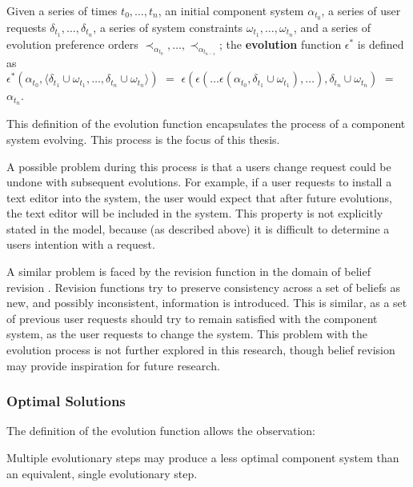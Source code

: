 \begin{defs}
Given a series of times $t_0,\ldots,t_n$, an initial component system $\alpha_{t_0}$, 
a series of user requests $\delta_{t_1},\ldots,\delta_{t_n}$, a series of system constraints $\omega_{t_1},\ldots,\omega_{t_n}$,
and a series of evolution preference orders $\prec_{\alpha_{t_0}},\ldots, \prec_{\alpha_{t_{n-1}}}$;
the \textbf{evolution} function $\epsilon^*$ is defined as\\
$\epsilon^*(\alpha_{t_0},\langle \delta_{t_1} \cup \omega_{t_1},\ldots,\delta_{t_n} \cup \omega_{t_n} \rangle)$ $=$ $\epsilon(\epsilon(\ldots \epsilon(\alpha_{t_0},\delta_{t_1} \cup \omega_{t_1}),\ldots),\delta_{t_n} \cup \omega_{t_n})$
$=$ $\alpha_{t_n}$.
\end{defs}

This definition of the evolution function encapsulates the process of a component system evolving.
This process is the focus of this thesis.

A possible problem during this process is that a users change request could be undone with subsequent evolutions.
For example, if a user requests to install a text editor into the system, 
the user would expect that after future evolutions, the text editor will be included in the system.
This property is not explicitly stated in the model, because (as described above) it is difficult to determine a users intention with a request.

A similar problem is faced by the revision function in the domain of belief revision \citep{alchourron1985logic}.
Revision functions try to preserve consistency across a set of beliefs as new, and possibly inconsistent, information is introduced.
This is similar, as a set of previous user requests should try to remain satisfied with the component system, as the user requests to change the system.    
This problem with the evolution process is not further explored in this research, though belief revision may provide inspiration for future research.

\subsubsection{Optimal Solutions}
The definition of the evolution function allows the observation:
\begin{obs}
Multiple evolutionary steps may produce a less optimal component system than an equivalent, single evolutionary step.
\end{obs}

